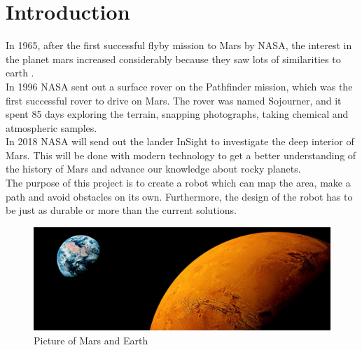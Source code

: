 \chapter{Introduction}\label{ch:introduction}

In 1965, after the first successful flyby mission to Mars by NASA, the interest in the planet mars increased considerably because they saw lots of similarities to earth \cite{NASAChronology}.\\
In 1996 NASA sent out a surface rover on the Pathfinder mission, which was the first successful rover to drive on Mars. The rover was named Sojourner, and it spent 85 days exploring the terrain, snapping photographs, taking chemical and atmospheric samples\cite{NASASojournerPathfinder}\cite{NASAChronology}.\\
In 2018 NASA will send out the lander InSight to investigate the deep interior of Mars. This will be done with modern technology to get a better understanding of the history of Mars and advance our knowledge about rocky planets\cite{InSight}.\\

The purpose of this project is to create a robot which can map the area, make a path and avoid obstacles on its own. Furthermore, the design of the robot has to be just as durable or more than the current solutions.\\


\begin{figure}[h]
    \centering
    \includegraphics[width=\linewidth]{figures/639620382-mars.jpg}
    \caption{Picture of Mars and Earth\cite{MarsPics}}
    \label{fig:marsSeasons}
\end{figure}

